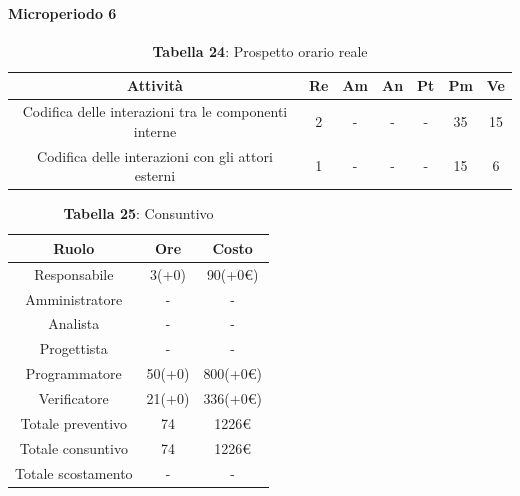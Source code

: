 \paragraph{Microperiodo 6}
\begin{table}[H]
	\centering
	\begin{tabular}{|c|c|c|c|c|c|c|}
		\hline
		\rowcolor{lighter-grayer}
		\textbf{Attività} & \textbf{Re}        & \textbf{Am}        & \textbf{An}        & \textbf{Pt}        & \textbf{Pm}        & \textbf{Ve}        \\ \hline
		
		Codifica delle interazioni tra le componenti interne & 2           & -           & -           & -           & 35          & 15          \\ \hline
		Codifica delle interazioni con gli attori esterni    & 1           & -           & -           & -           & 15          & 6           \\ \hline
		
	\end{tabular}
	\caption*{\textbf{Tabella 24}: Prospetto orario reale\\}
\end{table}

\begin{table}[H]
	\centering
	\renewcommand{\arraystretch}{1.5}
	\begin{tabular}{|c|c|c|}
		\hline
		\rowcolor{lighter-grayer}
		Ruolo & Ore & Costo \\ \hline
		Responsabile & 3(+0) & 90(+0\euro) \\ \hline
		Amministratore & - & - \\ \hline
		Analista & - & - \\ \hline
		Progettista & - & - \\ \hline
		Programmatore & 50(+0) & 800(+0\euro) \\ \hline
		Verificatore & 21(+0) & 336(+0\euro) \\ \hline
		Totale preventivo & 74 & 1226\euro \\ \hline
		Totale consuntivo & 74 & 1226\euro \\ \hline
		Totale scostamento & - & - \\ \hline
	\end{tabular}
	\caption*{\textbf{Tabella 25}: Consuntivo\\}
\end{table}

